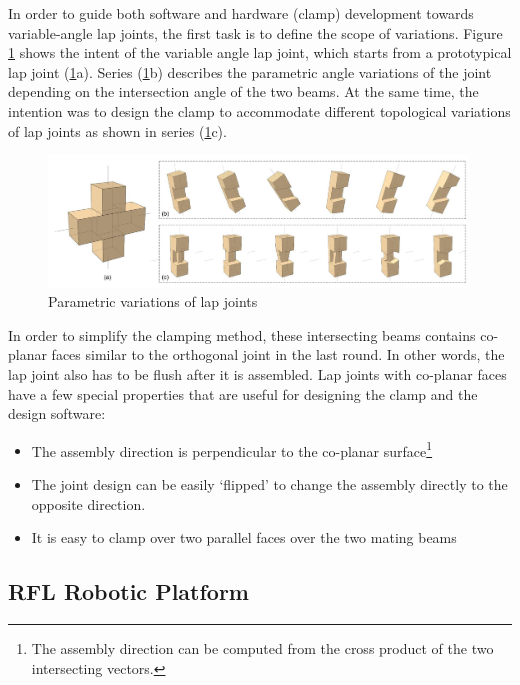 In order to guide both software and hardware (clamp) development towards variable-angle lap joints, the first task is to define the scope of variations. Figure \ref{fig:parametric-variations-of-lap-joints} shows the intent of the variable angle lap joint, which starts from a prototypical lap joint (\ref{fig:parametric-variations-of-lap-joints}a). Series (\ref{fig:parametric-variations-of-lap-joints}b) describes the parametric angle variations of the joint depending on the intersection angle of the two beams. At the same time, the intention was to design the clamp to accommodate different topological variations of lap joints as shown in series (\ref{fig:parametric-variations-of-lap-joints}c).

\begin{figure}
    \centering
    \includegraphics[width=0.99\textwidth]{images/05/image98.jpg}
    \caption{Parametric variations of lap joints}
    \label{fig:parametric-variations-of-lap-joints}
\end{figure}

In order to simplify the clamping method, these intersecting beams contains co-planar faces similar to the orthogonal joint in the last round. In other words, the lap joint also has to be flush after it is assembled. Lap joints with co-planar faces have a few special properties that are useful for designing the clamp and the design software:

\begin{itemize}
    \item The assembly direction is perpendicular to the co-planar surface\footnote{The assembly direction can be computed from the cross product of the two intersecting vectors.}
    \item The joint design can be easily ‘flipped’ to change the assembly directly to the opposite direction.
    \item It is easy to clamp over two parallel faces over the two mating beams
\end{itemize}

\subsection{RFL Robotic Platform}
\label{subsection:exploration-2-rfl-robotic-platform}

